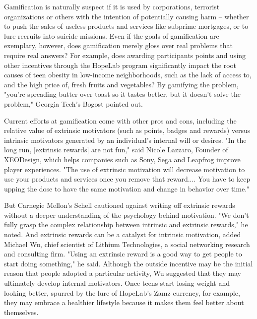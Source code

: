 Gamification is naturally suspect if it is used by corporations, terrorist organizations or others with the intention of potentially causing harm -- whether to push the sales of useless products and services like subprime mortgages, or to lure recruits into suicide missions. Even if the goals of gamification are exemplary, however, does gamification merely gloss over real problems that require real answers? For example, does awarding participants points and using other incentives through the HopeLab program significantly impact the root causes of teen obesity in low-income neighborhoods, such as the lack of access to, and the high price of, fresh fruits and vegetables? By gamifying the problem, "you're spreading butter over toast so it tastes better, but it doesn't solve the problem," Georgia Tech's Bogost pointed out.

Current efforts at gamification come with other pros and cons, including the relative value of extrinsic motivators (such as points, badges and rewards) versus intrinsic motivators generated by an individual's internal will or desires. "In the long run, [extrinsic rewards] are not fun," said Nicole Lazzaro, Founder of XEODesign, which helps companies such as Sony, Sega and Leapfrog improve player experiences. "The use of extrinsic motivation will decrease motivation to use your products and services once you remove that reward.... You have to keep upping the dose to have the same motivation and change in behavior over time."

But Carnegie Mellon's Schell cautioned against writing off extrinsic rewards without a deeper understanding of the psychology behind motivation. "We don't fully grasp the complex relationship between intrinsic and extrinsic rewards," he noted. And extrinsic rewards can be a catalyst for intrinsic motivation, added Michael Wu, chief scientist of Lithium Technologies, a social networking research and consulting firm. "Using an extrinsic reward is a good way to get people to start doing something," he said. Although the outside incentive may be the initial reason that people adopted a particular activity, Wu suggested that they may ultimately develop internal motivators. Once teens start losing weight and looking better, spurred by the lure of HopeLab's Zamz currency, for example, they may embrace a healthier lifestyle because it makes them feel better about themselves.


